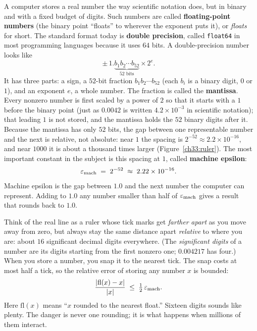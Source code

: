 A computer stores a real number the way scientific notation does, but in binary and
with a fixed budget of digits. Such numbers are called \textbf{floating-point numbers}
(the binary point ``floats'' to wherever the exponent puts it), or \emph{floats} for
short. The standard format today is \textbf{double precision}, called
\texttt{float64} in most programming languages because it uses $64$ bits. A
double-precision number looks like
\[
  \pm\, 1.\underbrace{b_1 b_2 \cdots b_{52}}_{\text{52 bits}} \times 2^{e}.
\]
It has three parts: a sign, a $52$-bit fraction $b_1b_2\cdots b_{52}$ (each $b_i$ is a
binary digit, $0$ or $1$), and an exponent $e$, a whole number. The fraction is called
the \textbf{mantissa}. Every nonzero number is first scaled by a power of $2$ so that it
starts with a $1$ before the binary point (just as $0.0042$ is written $4.2\times 10^{-3}$
in scientific notation); that leading $1$ is not stored, and the mantissa holds the
$52$ binary digits after it. Because the mantissa has only $52$ bits, the gap between one
representable number and the next is relative, not absolute: near $1$ the spacing is
$2^{-52}\approx 2.2\times 10^{-16}$, and near $1000$ it is about a thousand times larger
(Figure~\ref{ch33:ruler}). The most important constant in the subject is this spacing
at $1$, called \textbf{machine epsilon}:
\[
  \varepsilon_{\text{mach}} \;=\; 2^{-52} \;\approx\; 2.22\times 10^{-16}.
\]
Machine epsilon is the gap between $1.0$ and the next number the computer can
represent. Adding to $1.0$ any number smaller than half of $\varepsilon_{\text{mach}}$
gives a result that rounds back to $1.0$.

\begin{intuitionbox}
Think of the real line as a ruler whose tick marks get \emph{farther apart} as you
move away from zero, but always stay the same distance apart \emph{relative} to where
you are: about $16$ significant decimal digits everywhere. (The \emph{significant
digits} of a number are its digits starting from the first nonzero one; $0.004217$ has
four.) When you store a number, you snap it to the nearest tick. The snap costs at most
half a tick, so the relative error of storing any number $x$ is bounded:
\[
  \frac{\lvert\text{fl}(x) - x\rvert}{\lvert x\rvert} \;\le\; \tfrac12\,\varepsilon_{\text{mach}}.
\]
Here $\text{fl}(x)$ means ``$x$ rounded to the nearest float.'' Sixteen digits sounds
like plenty. The danger is never one rounding; it is what happens when millions of
them interact.
\end{intuitionbox}


